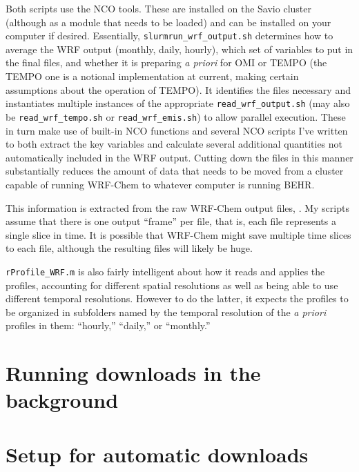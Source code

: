\documentclass[12pt]{article}
\begin{document}
	Both scripts use the NCO tools. These are installed on the Savio cluster (although as a module that needs to be loaded) and can be installed on your computer if desired. Essentially, \lstinline$slurmrun_wrf_output.sh$ determines how to average the WRF output (monthly, daily, hourly), which set of variables to put in the final files, and whether it is preparing \emph{a priori} for OMI or TEMPO (the TEMPO one is a notional implementation at current, making certain assumptions about the operation of TEMPO). It identifies the files necessary and instantiates multiple instances of the appropriate \lstinline$read_wrf_output.sh$ (may also be \lstinline$read_wrf_tempo.sh$ or \lstinline$read_wrf_emis.sh$) to allow parallel execution.  These in turn make use of built-in NCO functions and several NCO scripts I've written to both extract the key variables and calculate several additional quantities not automatically included in the WRF output. Cutting down the files in this manner substantially reduces the amount of data that needs to be moved from a cluster capable of running WRF-Chem to whatever computer is running BEHR.
	
	This information is extracted from the raw WRF-Chem output files, . My scripts assume that there is one output ``frame'' per file, that is, each file represents a single slice in time. It is possible that WRF-Chem might save multiple time slices to each file, although the resulting files will likely be huge. 
	
	\lstinline$rProfile_WRF.m$ is also fairly intelligent about how it reads and applies the  profiles, accounting for different spatial resolutions as well as being able to use different temporal resolutions. However to do the latter, it expects the profiles to be organized in subfolders named by the temporal resolution of the \emph{a priori} profiles in them: ``hourly,'' ``daily,'' or ``monthly.''
	
	

\newpage
\appendix
\appendixpage
\addappheadtotoc

\section{Running downloads in the background}

\section{Setup for automatic downloads} \label{app:autodl}
\end{document}
